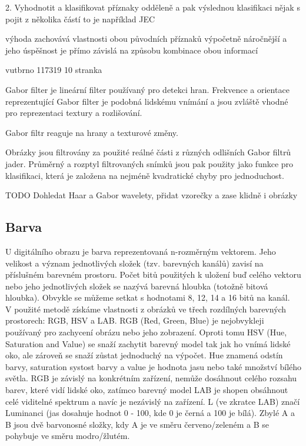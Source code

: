 \documentclass[czech,BP]{thesiskiv}
\begin{document}
2. Vyhodnotit a klasifikovat příznaky odděleně a pak výslednou klasifikaci nějak s pojit z několika částí 
	to je například JEC
	
	výhoda zachovává vlastnosti obou původních příznaků 
	výpočetně náročnější a jeho úspěšnost je přímo závislá na způsobu kombinace obou informací	
	
vutbrno 117319 10 stranka




Gabor filter je lineární filter používaný pro detekci hran. Frekvence a orientace reprezentující Gabor filter je podobná lidskému vnímání a jsou zvláště vhodné pro reprezentaci textury a rozlišování. 

Gabor filtr reaguje na hrany a texturové změny. 

Obrázky jsou filtrovány za použité reálné části z různých odlišních Gabor filtrů jader. Průměrný a rozptyl filtrovaných snímků jsou pak použity jako funkce pro klasifikaci, která je založena na nejméně kvadratické chyby pro jednoduchost.


TODO Dohledat Haar a Gabor wavelety, přidat vzorečky a zase klidně i obrázky

\subsection{Barva}
U digitálního obrazu je barva reprezentovaná n-rozměrným vektorem. Jeho velikost a význam jednotlivých složek (tzv. barevných kanálů) zavisí na příslušném barevném prostoru. Počet bitů použitých k uložení buď celého vektoru nebo jeho jednotlivých složek se nazývá barevná hloubka (totožně bitová hloubka). Obvykle se můžeme setkat s hodnotami 8, 12, 14 a 16 bitů na kanál. 
\\
V použité metodě získáme vlastnosti z obrázků ve třech rozdílných barevných prostorech: RGB, HSV a LAB. RGB (Red, Green, Blue) je nejobvykleji používaný pro zachycení obrázu nebo jeho zobrazení. Oproti tomu HSV (Hue, Saturation and Value) se snaží zachytit barevný model tak jak ho vnímá lidské oko, ale zároveň se snaží zůstat jednoduchý na výpočet. Hue znamená odstín barvy, saturation systost barvy a value je hodnota jasu nebo také množství bílého světla. RGB je závislý na konkrétním zařízení, nemůže dosáhnout celého rozsahu barev, které vidí lidské oko, zatímco barevný model LAB je shopen obsáhnout celé viditelné spektrum a navíc je nezávislý na zařízení. L (ve zkratce LAB) značí Luminanci (jas dosahuje hodnot 0 - 100, kde 0 je černá a 100 je bílá). Zbylé A a B jsou dvě barvonosné složky, kdy A je ve směru červeno/zeleném a B se pohybuje ve směru modro/žlutém. 
\end{document}
